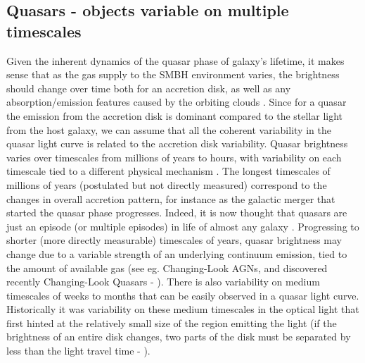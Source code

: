 \documentclass[modern]{aastex62}
\begin{document}
\subsection{Quasars - objects variable on multiple timescales }
Given the inherent dynamics of the quasar phase of galaxy's lifetime, it makes sense that as the gas supply to the SMBH environment varies, the brightness should change over time both for an accretion disk, as well as any absorption/emission features caused by the orbiting clouds \citep{stern2017, schawinski2015}.  Since for a quasar the emission from the accretion disk is dominant compared to the stellar light from the host galaxy, we can assume that all the coherent variability  in the quasar light curve is related to the accretion disk variability. Quasar brightness varies over timescales from millions of years to hours, with variability on each timescale tied to a different physical mechanism \citep{sartori2018}.  The longest timescales of millions of years (postulated but not directly measured) correspond to the changes in overall accretion pattern, for instance as the galactic merger that started the quasar phase progresses.  Indeed, it is now thought that quasars are just an episode (or multiple episodes) in life of almost any galaxy \citep{alexander2012, kormendy2013}. Progressing to shorter (more directly measurable) timescales of years, quasar brightness may change due to a variable strength of an underlying continuum emission, tied to the amount of available gas (see eg. Changing-Look AGNs, and discovered recently Changing-Look Quasars - \cite{ruan2016, macleod2016, graham2017}). There is also variability on medium timescales of weeks to months that can be easily observed in a quasar light curve. Historically it was variability on these medium timescales  in the optical light that first hinted at the relatively small size of the region emitting the light (if the brightness of an entire disk changes, two parts of the disk must be separated by less than the light travel time -  \cite{mudd2017, blackburne2011, morgan2010}). 
\end{document}
